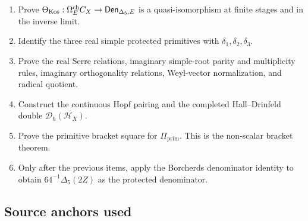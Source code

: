 \begin{enumerate}
Maurer--Cartan equation.
\item Prove
\(\Theta_{\mathrm{Kos}}:\Omega^{\mathrm{ch}}_E C_X\to\mathsf{Den}_{\Delta_5,E}\) is a
quasi-isomorphism at finite stages and in the inverse limit.
\item Identify the three real simple protected primitives with
\(\delta_1,\delta_2,\delta_3\).
\item Prove the real Serre relations, imaginary simple-root parity and
multiplicity rules, imaginary orthogonality relations, Weyl-vector
normalization, and radical quotient.
\item Construct the continuous Hopf pairing and the completed
Hall--Drinfeld double \(\mathcal D_\hbar(\mathcal H_X)\).
\item Prove the primitive bracket square for
\(\Pi_{\mathrm{prim}}\).  This is the non-scalar bracket theorem.
\item Only after the previous items, apply the Borcherds denominator
identity to obtain \(64^{-1}\Delta_5(2Z)\) as the protected
denominator.
\end{enumerate}

\subsection{Source anchors used}
\label{subsec:cell-eleven-source-anchors}

